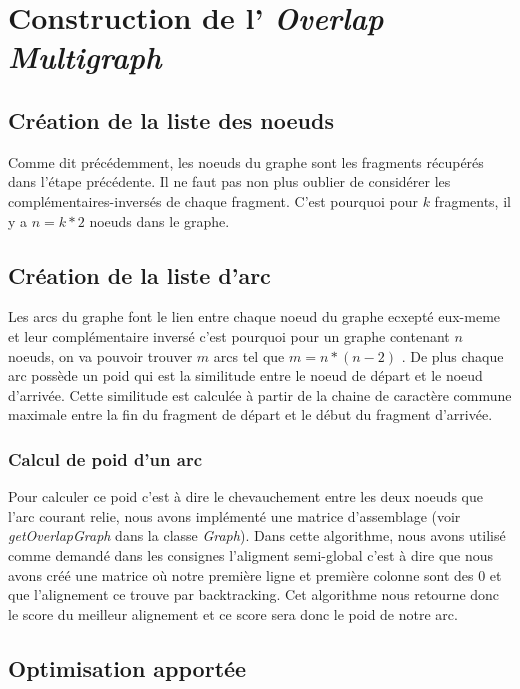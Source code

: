 \documentclass[a4paper, 12pt]{article}
\begin{document}
\section{Construction de l' \textit{Overlap Multigraph}}

	\subsection{Création de la liste des noeuds}
		Comme dit précédemment, les noeuds du graphe sont les fragments récupérés dans l'étape précédente. Il ne faut pas non plus oublier de considérer les complémentaires-inversés de chaque fragment. C'est pourquoi pour $k$ fragments, il y a $ n = k * 2$ noeuds dans le graphe.
	
	\subsection{Création de la liste d'arc}
		Les arcs du graphe font le lien entre chaque noeud du graphe ecxepté eux-meme et leur complémentaire inversé c'est pourquoi pour un graphe contenant $n$ noeuds, on va pouvoir trouver $m$ arcs tel que $ m = n * (n-2)$ . De plus chaque arc possède un poid qui est la similitude entre le noeud de départ et le noeud d'arrivée. Cette similitude est calculée à partir de la chaine de caractère commune maximale entre la fin du fragment de départ et le début du fragment d'arrivée.
			
	\subsubsection{Calcul de poid d'un arc}
		Pour calculer ce poid c'est à dire le chevauchement entre les deux noeuds que l'arc courant relie, nous avons implémenté une matrice d'assemblage (voir \textit{getOverlapGraph} dans la classe \textit{Graph}). Dans cette algorithme, nous avons utilisé comme demandé dans les consignes l'aligment semi-global c'est à dire que nous avons créé une matrice où notre première ligne et première colonne sont des 0 et que l'alignement ce trouve par backtracking. Cet algorithme nous retourne donc le score du meilleur alignement et ce score sera donc le poid de notre arc.
	
	\subsection{Optimisation apportée}
\end{document}
